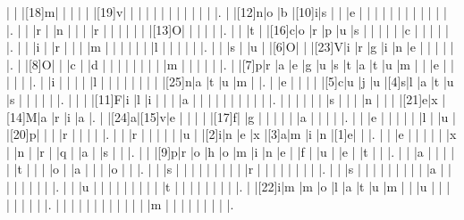 \documentclass[12pt]{article}
\begin{document}
\begin{Puzzle}{22}{24}
  |{}  |{}  |[18]m|{}  |{}  |{}  |{}  |{}  |[19]v|{}  |{}  |{}  |{}  |{}  |{}  |{}  |{}  |{}  |{}  |{}  |{}  |.
  |{}  |[12]n|o   |b   |[10]i|s   |{}  |{}  |e   |{}  |{}  |{}  |{}  |{}  |{}  |{}  |{}  |{}  |{}  |{}  |{}  |.
  |{}  |{}  |r   |{}  |n   |{}  |{}  |{}  |r   |{}  |{}  |{}  |{}  |{}  |{}  |[13]O|{}  |{}  |{}  |{}  |{}  |.
  |{}  |{}  |t   |{}  |[16]c|o   |r   |p   |u   |s   |{}  |{}  |{}  |{}  |{}  |c   |{}  |{}  |{}  |{}  |{}  |.
  |{}  |{}  |i   |{}  |r   |{}  |{}  |{}  |m   |{}  |{}  |{}  |{}  |{}  |{}  |l   |{}  |{}  |{}  |{}  |{}  |.
  |{}  |{}  |s   |{}  |u   |{}  |[6]O|{}  |{}  |[23]V|i   |r   |g   |i   |n   |e   |{}  |{}  |{}  |{}  |{}  |.
  |{}  |[8]O|{}  |{}  |c   |{}  |d   |{}  |{}  |{}  |{}  |{}  |{}  |{}  |{}  |m   |{}  |{}  |{}  |{}  |{}  |.
  |{}  |[7]p|r   |a   |e   |g   |u   |s   |t   |a   |t   |u   |m   |{}  |{}  |e   |{}  |{}  |{}  |{}  |{}  |.
  |{}  |i   |{}  |{}  |{}  |{}  |l   |{}  |{}  |{}  |{}  |{}  |{}  |{}  |{}  |[25]n|a   |t   |u   |m   |{}  |.
  |{}  |e   |{}  |{}  |{}  |{}  |[5]c|u   |j   |u   |[4]s|l   |a   |t   |u   |s   |{}  |{}  |{}  |{}  |{}  |.
  |{}  |{}  |{}  |[11]F|i   |l   |i   |{}  |{}  |{}  |a   |{}  |{}  |{}  |{}  |{}  |{}  |{}  |{}  |{}  |{}  |.
  |{}  |{}  |{}  |{}  |{}  |{}  |s   |{}  |{}  |{}  |n   |{}  |{}  |{}  |[21]e|x   |[14]M|a   |r   |i   |a   |.
  |{}  |[24]a|[15]v|e   |{}  |{}  |{}  |{}  |[17]f|{}  |g   |{}  |{}  |{}  |{}  |{}  |a   |{}  |{}  |{}  |{}  |.
  |{}  |{}  |e   |{}  |{}  |{}  |{}  |{}  |l   |{}  |u   |{}  |[20]p|{}  |{}  |{}  |r   |{}  |{}  |{}  |{}  |.
  |{}  |{}  |r   |{}  |{}  |{}  |{}  |{}  |u   |{}  |[2]i|n   |e   |x   |[3]a|m   |i   |n   |[1]e|{}  |{}  |.
  |{}  |{}  |e   |{}  |{}  |{}  |{}  |{}  |x   |{}  |n   |{}  |r   |{}  |q   |{}  |a   |{}  |s   |{}  |{}  |.
  |{}  |{}  |[9]p|r   |o   |h   |o   |m   |i   |n   |e   |{}  |f   |{}  |u   |{}  |e   |{}  |t   |{}  |{}  |.
  |{}  |{}  |a   |{}  |{}  |{}  |{}  |{}  |t   |{}  |{}  |{}  |o   |{}  |a   |{}  |{}  |{}  |o   |{}  |{}  |.
  |{}  |{}  |s   |{}  |{}  |{}  |{}  |{}  |{}  |{}  |{}  |{}  |r   |{}  |{}  |{}  |{}  |{}  |{}  |{}  |{}  |.
  |{}  |{}  |s   |{}  |{}  |{}  |{}  |{}  |{}  |{}  |{}  |{}  |a   |{}  |{}  |{}  |{}  |{}  |{}  |{}  |{}  |.
  |{}  |{}  |u   |{}  |{}  |{}  |{}  |{}  |{}  |{}  |{}  |{}  |t   |{}  |{}  |{}  |{}  |{}  |{}  |{}  |{}  |.
  |{}  |[22]i|m   |m   |o   |l   |a   |t   |u   |m   |{}  |{}  |u   |{}  |{}  |{}  |{}  |{}  |{}  |{}  |{}  |.
  |{}  |{}  |{}  |{}  |{}  |{}  |{}  |{}  |{}  |{}  |{}  |{}  |m   |{}  |{}  |{}  |{}  |{}  |{}  |{}  |{}  |.
\end{Puzzle}
\end{document}
